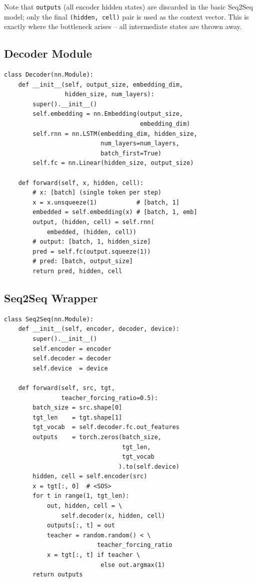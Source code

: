 \documentclass[12pt,a4paper]{article}
\begin{document}
Note that \texttt{outputs} (all encoder hidden states) are discarded in the basic Seq2Seq model;
only the final \texttt{(hidden, cell)} pair is used as the context vector. This is exactly
where the bottleneck arises -- all intermediate states are thrown away.

\subsection{Decoder Module}

\begin{tcolorbox}[colback=gray!5!white,colframe=gray!60!black,title=\texttt{Decoder} (PyTorch)]
\begin{verbatim}
class Decoder(nn.Module):
    def __init__(self, output_size, embedding_dim,
                 hidden_size, num_layers):
        super().__init__()
        self.embedding = nn.Embedding(output_size,
                                      embedding_dim)
        self.rnn = nn.LSTM(embedding_dim, hidden_size,
                           num_layers=num_layers,
                           batch_first=True)
        self.fc = nn.Linear(hidden_size, output_size)

    def forward(self, x, hidden, cell):
        # x: [batch] (single token per step)
        x = x.unsqueeze(1)           # [batch, 1]
        embedded = self.embedding(x) # [batch, 1, emb]
        output, (hidden, cell) = self.rnn(
            embedded, (hidden, cell))
        # output: [batch, 1, hidden_size]
        pred = self.fc(output.squeeze(1))
        # pred: [batch, output_size]
        return pred, hidden, cell
\end{verbatim}
\end{tcolorbox}

\subsection{Seq2Seq Wrapper}

\begin{tcolorbox}[colback=gray!5!white,colframe=gray!60!black,title=\texttt{Seq2Seq} (PyTorch)]
\begin{verbatim}
class Seq2Seq(nn.Module):
    def __init__(self, encoder, decoder, device):
        super().__init__()
        self.encoder = encoder
        self.decoder = decoder
        self.device  = device

    def forward(self, src, tgt,
                teacher_forcing_ratio=0.5):
        batch_size = src.shape[0]
        tgt_len    = tgt.shape[1]
        tgt_vocab  = self.decoder.fc.out_features
        outputs    = torch.zeros(batch_size,
                                 tgt_len,
                                 tgt_vocab
                                ).to(self.device)
        hidden, cell = self.encoder(src)
        x = tgt[:, 0]  # <SOS>
        for t in range(1, tgt_len):
            out, hidden, cell = \
                self.decoder(x, hidden, cell)
            outputs[:, t] = out
            teacher = random.random() < \
                          teacher_forcing_ratio
            x = tgt[:, t] if teacher \
                           else out.argmax(1)
        return outputs
\end{verbatim}
\end{tcolorbox}
\end{document}
